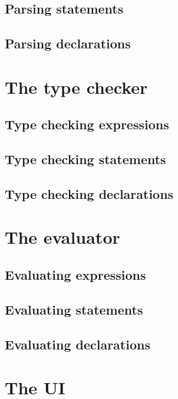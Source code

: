 \documentclass[11pt, american, draft]{PhdThesis}
\begin{document}
  \subsection{Parsing statements}

  \subsection{Parsing declarations}

  \section{The type checker}

  \subsection{Type checking expressions}

  \subsection{Type checking statements}

  \subsection{Type checking declarations}

  \section{The evaluator}

  \subsection{Evaluating expressions}

  \subsection{Evaluating statements}

  \subsection{Evaluating declarations}

  \section{The UI}

  \backmatter





  \backmatter

  \printbibliography

\end{document}
